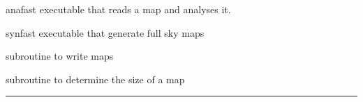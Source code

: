 

\begin{related}
  \begin{sulist}{} %
  \item[anafast] executable that reads a \healpix map and analyses it. 
  \item[synfast] executable that generate full sky \healpix maps
  \item[\htmlref{write\_healpix\_map}{csub:write_healpix_map}] subroutine to write \healpix maps
  \item[\htmlref{get\_fits\_size}{csub:get_fits_size}] subroutine to determine
  the size of a map
  \end{sulist}
\end{related}

\rule{\hsize}{2mm}

\newpage
